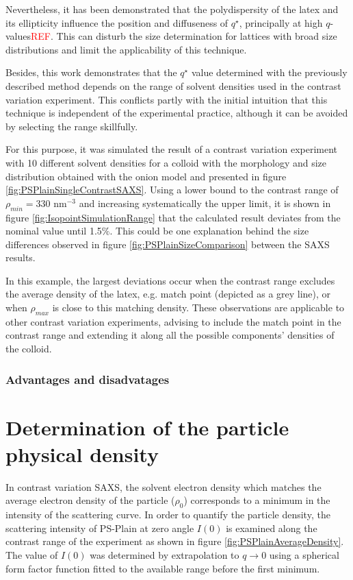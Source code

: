 Nevertheless, it has been demonstrated that the polydispersity of the latex and its ellipticity influence the position and diffuseness of $q^{\star}$, principally at high $q$-values\textcolor{red}{REF}. This can disturb the size determination for lattices with broad size distributions and limit the applicability of this technique.

Besides, this work demonstrates that the $q^{\star}$ value determined with the previously described method depends on the range of solvent densities used in the contrast variation experiment. This conflicts partly with the initial intuition that this technique is independent of the experimental practice, although it can be avoided by selecting the range skillfully.

For this purpose, it was simulated the result of a contrast variation experiment with 10 different solvent densities for a colloid with the morphology and size distribution obtained with the onion model and presented in figure \ref{fig:PSPlainSingleContrastSAXS}. Using a lower bound to the contrast range of $\rho_{min}=330$ nm$^{-3}$ and increasing systematically the upper limit, it is shown in figure \ref{fig:IsopointSimulationRange} that the calculated result deviates from the nominal value until 1.5$\%$. This could be one explanation behind the size differences observed in figure \ref{fig:PSPlainSizeComparison} between the SAXS results.

In this example, the largest deviations occur when the contrast range excludes the average density of the latex, e.g. match point (depicted as a grey line), or when $\rho_{max}$ is close to this matching density. These observations are applicable to other contrast variation experiments, advising to include the match point in the contrast range and extending it along all the possible components' densities of the colloid.
\subsubsection{Advantages and disadvatages}

\section{Determination of the particle physical density}
\label{sec:physical_density}
In contrast variation SAXS, the solvent electron density which matches the average electron density of the particle ($\rho_0$) corresponds to a minimum in the intensity of the scattering curve. In order to quantify the particle density, the scattering intensity of PS-Plain at zero angle $I(0)$ is examined along the contrast range of the experiment as shown in figure \ref{fig:PSPlainAverageDensity}. The value of $I(0)$ was determined by extrapolation to $q\rightarrow 0$ using a spherical form factor function fitted to the available range before the first minimum.


